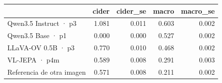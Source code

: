 \begin{tabular}{lrrrr}
\toprule
 & cider & cider\_se & macro & macro\_se \\
\midrule
Qwen3.5 Instruct · p3 & 1.081 & 0.011 & 0.603 & 0.002 \\
Qwen3.5 Base · p1 & 0.000 & 0.000 & 0.527 & 0.002 \\
LLaVA-OV 0.5B · p3 & 0.770 & 0.010 & 0.468 & 0.002 \\
VL-JEPA · p4m & 0.589 & 0.008 & 0.291 & 0.003 \\
Referencia de otra imagen & 0.571 & 0.008 & 0.211 & 0.002 \\
\bottomrule
\end{tabular}
